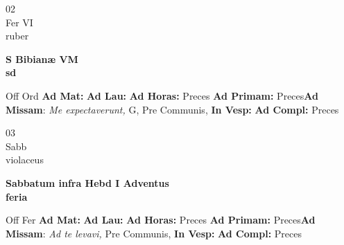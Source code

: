 \documentclass[10pt, openany]{book}
\begin{document}
    \begin{center}
        \begin{minipage}{3.5in}
            \vspace{2em}
            \begin{minipage}{0.5in}
                {\Huge 02} \\
                {\normalsize Fer VI} \\
                {\normalsize ruber}
            \end{minipage}
            \begin{minipage}{3.0in}
                \textbf{ \large S Bibianæ VM \\
                \textnormal{\normalsize sd}} \\ 
            \end{minipage}
            \begin{justify}Off Ord
                \textbf{Ad Mat: }
                \textbf{Ad Lau: }
                \textbf{Ad Horas: }Preces
                \textbf{Ad Primam: }Preces\textbf{Ad Missam}: \textit{Me expectaverunt,} G, Pre Communis,  
                \textbf{In Vesp: }
                \textbf{Ad Compl: }Preces
            \end{justify}
        \end{minipage}
    \end{center}

    \begin{center}
        \begin{minipage}{3.5in}
            \vspace{2em}
            \begin{minipage}{0.5in}
                {\Huge 03} \\
                {\normalsize Sabb} \\
                {\normalsize violaceus}
            \end{minipage}
            \begin{minipage}{3.0in}
                \textbf{ \large Sabbatum infra Hebd I Adventus \\
                \textnormal{\normalsize feria}} \\ 
            \end{minipage}
            \begin{justify}Off Fer
                \textbf{Ad Mat: }
                \textbf{Ad Lau: }
                \textbf{Ad Horas: }Preces
                \textbf{Ad Primam: }Preces\textbf{Ad Missam}: \textit{Ad te levavi,} Pre Communis,  
                \textbf{In Vesp: }
                \textbf{Ad Compl: }Preces
            \end{justify}
        \end{minipage}
    \end{center}
\end{document}

